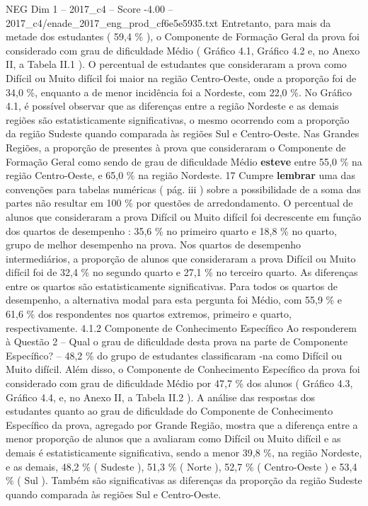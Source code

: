 \begin{textsample}{NEG Dim 1 – 2017\_c4 – Score -4.00 – 2017\_c4/enade\_2017\_eng\_prod\_cf6e5e5935.txt}
Entretanto, para mais da metade dos estudantes ( 59,4 \% ), o Componente de Formação Geral da prova foi considerado com grau de dificuldade Médio ( Gráfico 4.1, Gráfico 4.2 e, no Anexo II, a Tabela II.1 ).
O percentual de estudantes que consideraram a prova como Difícil ou Muito difícil foi maior na região Centro-Oeste, onde a proporção foi de 34,0 \%, enquanto a de menor incidência foi a Nordeste, com 22,0 \%.
No Gráfico 4.1, é possível observar que as diferenças entre a região Nordeste e as demais regiões são estatisticamente significativas, o mesmo ocorrendo com a proporção da região Sudeste quando comparada às regiões Sul e Centro-Oeste.
Nas Grandes Regiões, a proporção de presentes à prova que consideraram o Componente de Formação Geral como sendo de grau de dificuldade Médio \textbf{esteve} entre 55,0 \% na região Centro-Oeste, e 65,0 \% na região Nordeste. 17 Cumpre \textbf{lembrar} uma das convenções para tabelas numéricas ( pág. iii ) sobre a possibilidade de a soma das partes não resultar em 100 \% por questões de arredondamento.
O percentual de alunos que consideraram a prova Difícil ou Muito difícil foi decrescente em função dos quartos de desempenho : 35,6 \% no primeiro quarto e 18,8 \% no quarto, grupo de melhor desempenho na prova.
Nos quartos de desempenho intermediários, a proporção de alunos que consideraram a prova Difícil ou Muito difícil foi de 32,4 \% no segundo quarto e 27,1 \% no terceiro quarto.
As diferenças entre os quartos são estatisticamente significativas.
Para todos os quartos de desempenho, a alternativa modal para esta pergunta foi Médio, com 55,9 \% e 61,6 \% dos respondentes nos quartos extremos, primeiro e quarto, respectivamente. 4.1.2 Componente de Conhecimento Específico Ao responderem à Questão 2 – Qual o grau de dificuldade desta prova na parte de Componente Específico? – 48,2 \% do grupo de estudantes classificaram -na como Difícil ou Muito difícil.
Além disso, o Componente de Conhecimento Específico da prova foi considerado com grau de dificuldade Médio por 47,7 \% dos alunos ( Gráfico 4.3, Gráfico 4.4, e, no Anexo II, a Tabela II.2 ).
A análise das respostas dos estudantes quanto ao grau de dificuldade do Componente de Conhecimento Específico da prova, agregado por Grande Região, mostra que a diferença entre a menor proporção de alunos que a avaliaram como Difícil ou Muito difícil e as demais é estatisticamente significativa, sendo a menor 39,8 \%, na região Nordeste, e as demais, 48,2 \% ( Sudeste ), 51,3 \% ( Norte ), 52,7 \% ( Centro-Oeste ) e 53,4 \% ( Sul ).
Também são significativas as diferenças da proporção da região Sudeste quando comparada às regiões Sul e Centro-Oeste.

\end{textsample}
